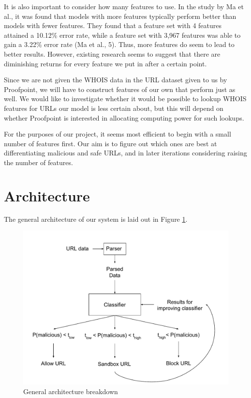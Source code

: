 \documentclass[cs,proposal]{hmcclinic}
\begin{document}
It is also important to consider how many features to use. In the study by Ma et al., it was found that models with more features typically perform better than models with fewer features. They found that a feature set with 4 features attained a 10.12\% error rate, while a feature set with 3,967 features was able to gain a 3.22\% error rate (Ma et al., 5). Thus, more features do seem to lead to better results. However, existing research seems to suggest that there are diminishing returns for every feature we put in after a certain point.

Since we are not given the WHOIS data in the URL dataset given to us by Proofpoint, we will have to construct features of our own that perform just as well. We would like to investigate whether it would be possible to lookup WHOIS features for URLs our model is less certain about, but this will depend on whether Proofpoint is interested in allocating computing power for such lookups.

For the purposes of our project, it seems most efficient to begin with a small number of features first. Our aim is to figure out which ones are best at differentiating malicious and safe URLs, and in later iterations considering raising the number of features.


\section{Architecture}

The general architecture of our system is laid out in Figure \ref{architecture-fig}.

\begin{figure}[ht]
  \centering
    \includegraphics[scale=0.75]{architecture_diagram}
  \caption{General architecture breakdown}
  \label{architecture-fig}
\end{figure}
\end{document}
